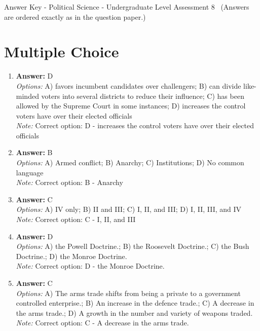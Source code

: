 \documentclass[12pt]{article}
\begin{document}
\begin{center}
Answer Key - Political Science - Undergraduate Level Assessment 8 \
\small (Answers are ordered exactly as in the question paper.)
\end{center}

\section*{Multiple Choice}
\begin{enumerate}[label=\arabic*.]
\item \textbf{Answer:} D
\\ \textit{Options:} A) favors incumbent candidates over challengers; B) can divide like-minded voters into several districts to reduce their influence; C) has been allowed by the Supreme Court in some instances; D) increases the control voters have over their elected officials
\\ \textit{Note:} Correct option: D - increases the control voters have over their elected officials
\item \textbf{Answer:} B
\\ \textit{Options:} A) Armed conflict; B) Anarchy; C) Institutions; D) No common language
\\ \textit{Note:} Correct option: B - Anarchy
\item \textbf{Answer:} C
\\ \textit{Options:} A) IV only; B) II and III; C) I, II, and III; D) I, II, III, and IV
\\ \textit{Note:} Correct option: C - I, II, and III
\item \textbf{Answer:} D
\\ \textit{Options:} A) the Powell Doctrine.; B) the Roosevelt Doctrine.; C) the Bush Doctrine.; D) the Monroe Doctrine.
\\ \textit{Note:} Correct option: D - the Monroe Doctrine.
\item \textbf{Answer:} C
\\ \textit{Options:} A) The arms trade shifts from being a private to a government controlled enterprise.; B) An increase in the defence trade.; C) A decrease in the arms trade.; D) A growth in the number and variety of weapons traded.
\\ \textit{Note:} Correct option: C - A decrease in the arms trade.
\end{enumerate}
\end{document}
